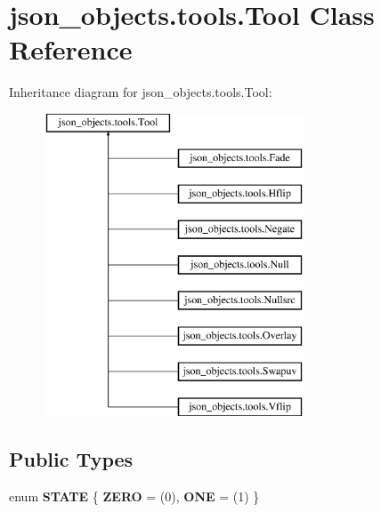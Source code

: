 \hypertarget{classjson__objects_1_1tools_1_1_tool}{
\section{json\_\-objects.tools.Tool Class Reference}
\label{classjson__objects_1_1tools_1_1_tool}
}
Inheritance diagram for json\_\-objects.tools.Tool:\begin{figure}[H]
\begin{center}
\leavevmode
\includegraphics[height=9.000000cm]{classjson__objects_1_1tools_1_1_tool}
\end{center}
\end{figure}
\subsection*{Public Types}
\begin{DoxyCompactItemize}
\item 
enum {\bfseries STATE} \{ {\bfseries ZERO} = (0), 
{\bfseries ONE} = (1)
 \}
\end{DoxyCompactItemize}
